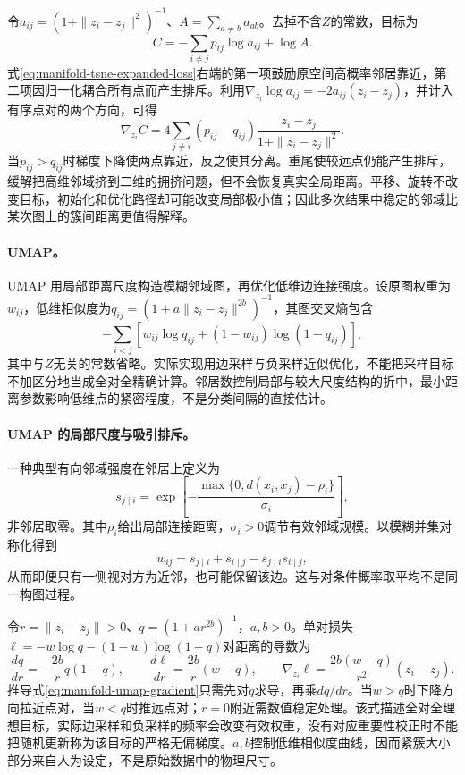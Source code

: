 令$a_{ij}=(1+\|z_i-z_j\|^2)^{-1}$、$A=\sum_{a\ne b}a_{ab}$。去掉不含$Z$的常数，目标为
\begin{equation}
 C=-\sum_{i\ne j}p_{ij}\log a_{ij}+\log A.\label{eq:manifold-tsne-expanded-loss}
\end{equation}
式\eqref{eq:manifold-tsne-expanded-loss}右端的第一项鼓励原空间高概率邻居靠近，第二项因归一化耦合所有点而产生排斥。利用$\nabla_{z_i}\log a_{ij}=-2a_{ij}(z_i-z_j)$，并计入有序点对的两个方向，可得
\begin{equation}
 \nabla_{z_i}C=4\sum_{j\ne i}(p_{ij}-q_{ij})
 \frac{z_i-z_j}{1+\|z_i-z_j\|^2}.
\end{equation}
当$p_{ij}>q_{ij}$时梯度下降使两点靠近，反之使其分离。重尾使较远点仍能产生排斥，缓解把高维邻域挤到二维的拥挤问题，但不会恢复真实全局距离。平移、旋转不改变目标，初始化和优化路径却可能改变局部极小值；因此多次结果中稳定的邻域比某次图上的簇间距离更值得解释。

\paragraph{UMAP。}
UMAP 用局部距离尺度构造模糊邻域图，再优化低维边连接强度\cite{mcinnes2018umap}。设原图权重为$w_{ij}$，低维相似度为$q_{ij}=(1+a\|z_i-z_j\|^{2b})^{-1}$，其图交叉熵包含
\begin{equation}
 -\sum_{i<j}\left[w_{ij}\log q_{ij}+(1-w_{ij})\log(1-q_{ij})\right],
\end{equation}
其中与$Z$无关的常数省略。实际实现用边采样与负采样近似优化，不能把采样目标不加区分地当成全对全精确计算。邻居数控制局部与较大尺度结构的折中，最小距离参数影响低维点的紧密程度，不是分类间隔的直接估计。

\paragraph{UMAP 的局部尺度与吸引排斥。}
一种典型有向邻域强度在邻居上定义为
\begin{equation}
 s_{j\mid i}=\exp\left[-\frac{\max\{0,d(x_i,x_j)-\rho_i\}}{\sigma_i}\right],
\end{equation}
非邻居取零。其中$\rho_i$给出局部连接距离，$\sigma_i>0$调节有效邻域规模。以模糊并集对称化得到
\begin{equation}
 w_{ij}=s_{j\mid i}+s_{i\mid j}-s_{j\mid i}s_{i\mid j},
\end{equation}
从而即便只有一侧视对方为近邻，也可能保留该边。这与对条件概率取平均不是同一构图过程。

令$r=\|z_i-z_j\|>0$、$q=(1+ar^{2b})^{-1}$，$a,b>0$。单对损失$\ell=-w\log q-(1-w)\log(1-q)$对距离的导数为
\begin{equation}
 \frac{dq}{dr}=-\frac{2b}{r}q(1-q),\qquad
 \frac{d\ell}{dr}=\frac{2b}{r}(w-q),\qquad
 \nabla_{z_i}\ell=\frac{2b(w-q)}{r^2}(z_i-z_j).\label{eq:manifold-umap-gradient}
\end{equation}
推导式\eqref{eq:manifold-umap-gradient}只需先对$q$求导，再乘$dq/dr$。当$w>q$时下降方向拉近点对，当$w<q$时推远点对；$r=0$附近需数值稳定处理。该式描述全对全理想目标，实际边采样和负采样的频率会改变有效权重，没有对应重要性校正时不能把随机更新称为该目标的严格无偏梯度。$a,b$控制低维相似度曲线，因而紧簇大小部分来自人为设定，不是原始数据中的物理尺寸。

